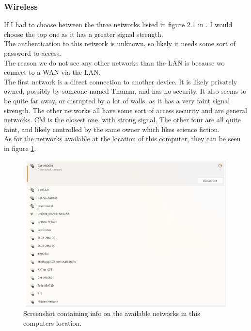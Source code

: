 \documentclass[11pt, A4paper, english]{article}
\begin{document}
			\subsubsection{Wireless}
If I had to choose between the three networks listed in figure 2.1 in \cite{Assignment}. I would choose the top one as it has a greater signal strength. \\
The authentication to this network is unknown, so likely it needs some sort of password to access. \\
The reason we do not see any other networks than the LAN is because wo connect to a WAN via the LAN. \\
The first network is a direct connection to another device. It is likely privately owned, possibly by someone named Thamm, and has no security. It also seems to be quite far away, or disrupted by a lot of walls, as it has a very faint signal strength. The other networks all have some sort of access security and are general networks. CM is the closest one, with strong signal, The other four are all quite faint, and likely controlled by the same owner which likes science fiction. \\
As for the networks available at the location of this computer, they can be seen in figure \ref{im:av_net}. 
				\begin{figure}
\includegraphics[width=12.6cm, height=8cm]{available_networks.png}
\caption{Screenshot containing info on the available networks in this computers location.}
\label{im:av_net}	
				\end{figure}
\end{document}
